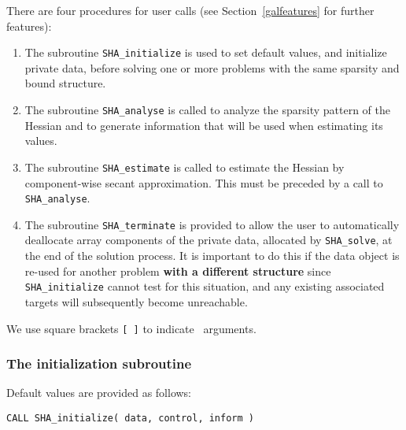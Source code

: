 \documentclass{galahad}
\newcommand{\packagename}{SHA}
\begin{document}

\galarguments
There are four procedures for user calls
(see Section~\ref{galfeatures} for further features): 

\begin{enumerate}
\item The subroutine 
      {\tt \packagename\_initialize} 
      is used to set default values, and initialize private data, 
      before solving one or more problems with the
      same sparsity and bound structure.
\item The subroutine 
      {\tt \packagename\_analyse} 
      is called to analyze the sparsity pattern of the Hessian
      and to generate information that will be used when estimating 
      its values.
\item The subroutine 
      {\tt \packagename\_estimate} 
      is called to estimate the Hessian by component-wise secant 
      approximation. This must be preceded by a call to 
      {\tt \packagename\_analyse}.
\item The subroutine 
      {\tt \packagename\_terminate} 
      is provided to allow the user to automatically deallocate array 
       components of the private data, allocated by 
       {\tt \packagename\_solve}, 
       at the end of the solution process. 
       It is important to do this if the data object is re-used for another 
       problem {\bf with a different structure}
       since {\tt \packagename\_initialize} cannot test for this situation, 
       and any existing associated targets will subsequently become unreachable.
\end{enumerate}
We use square brackets {\tt [ ]} to indicate \optional\ arguments.


\subsubsection{The initialization subroutine}\label{subinit}
 Default values are provided as follows:
\vspace*{1mm}

\hspace{8mm}
{\tt CALL \packagename\_initialize( data, control, inform )}
\end{document}

